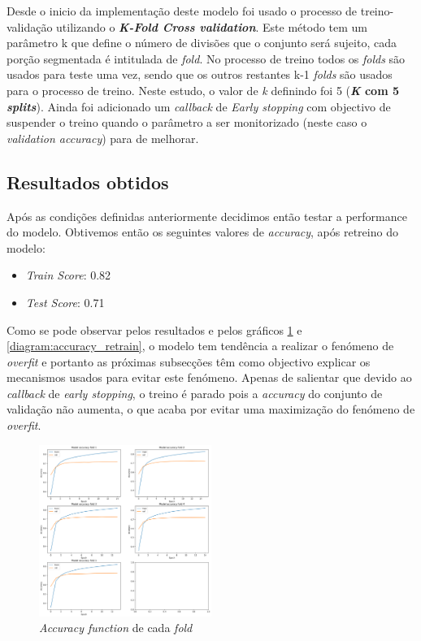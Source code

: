 Desde o inicio da implementação deste modelo foi usado o processo de treino-validação utilizando o \textbf{\textit{K-Fold Cross validation}}. Este método tem um parâmetro k que define o número de divisões que o conjunto será sujeito, cada porção segmentada é intitulada de \textit{fold}. No processo de treino todos os \textit{folds} são usados para teste uma vez, sendo que os outros restantes k-1 \textit{folds} são usados para o processo de treino. Neste estudo, o valor de \textit{k} definindo foi 5 (\textbf{\textit{K} com 5 \textit{splits}}).
Ainda foi adicionado um \textit{callback} de \textit{Early stopping} com objectivo de suspender o treino quando o parâmetro a ser monitorizado (neste caso o \textit{validation accuracy}) para de melhorar.


\subsection{Resultados obtidos}

Após as condições definidas anteriormente decidimos então testar a performance do modelo. 
Obtivemos então os seguintes valores de \textit{accuracy}, após retreino do modelo:

\begin{itemize}
        \item \textit{Train Score}: 0.82
        \item \textit{Test Score}: 0.71
\end{itemize}


Como se pode observar pelos resultados e pelos gráficos \ref{diagram:accuracy_fold_first} e \ref{diagram:accuracy_retrain}, o modelo tem tendência a realizar o fenómeno de \textit{overfit} e portanto as próximas subsecções têm como objectivo explicar os mecanismos usados para evitar este fenómeno. Apenas de salientar que devido ao \textit{callback} de  \textit{early stopping}, o treino é parado pois a \textit{accuracy} do conjunto de validação não aumenta, o que acaba por evitar uma maximização do fenómeno de \textit{overfit}.



\begin{figure}[t]
\begin{center}
\includegraphics[width=0.5\textwidth,keepaspectratio]{figures/merged_fold_graphics_first.png}
\caption{\textit{Accuracy function} de cada \textit{fold}}
\label{diagram:accuracy_fold_first}
\centering
\end{center}
\end{figure}

